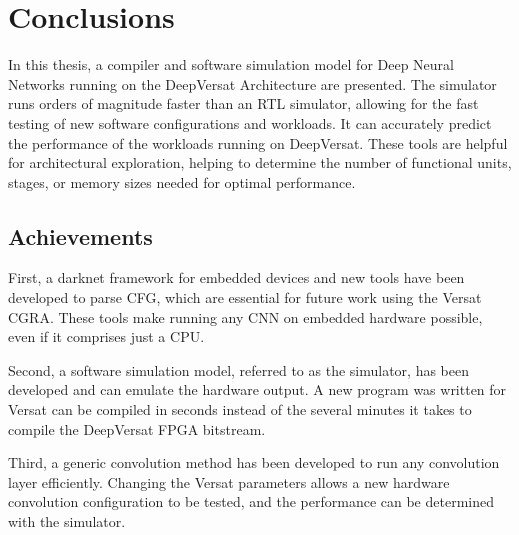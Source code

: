 
\chapter{Conclusions}
\label{chapter:conclusions}

In this thesis, a compiler and software simulation model for Deep Neural
Networks running on the DeepVersat Architecture are presented. The simulator
runs orders of magnitude faster than an RTL simulator, allowing for the fast
testing of new software configurations and workloads. It can accurately predict the
performance of the workloads running on DeepVersat. These tools are helpful for
architectural exploration, helping to determine the number of functional units,
stages, or memory sizes needed for optimal performance.


\section{Achievements}
\label{section:achievements}

First, a darknet framework for embedded devices and new tools have been
developed to parse CFG, which are essential for future work using the Versat
CGRA. These tools make running any CNN on embedded hardware possible, even if
it comprises just a CPU.

Second, a software simulation model, referred to as the simulator, has been
developed and can emulate the hardware output. A new program was written for
Versat can be compiled in seconds instead of the several minutes it takes to
compile the DeepVersat FPGA bitstream.

Third, a generic convolution method has been developed to run any 
convolution layer efficiently. Changing the Versat
parameters allows a new hardware convolution configuration to be tested, and the
performance can be determined with the simulator.

